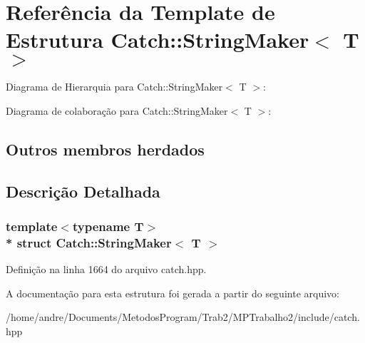 \hypertarget{structCatch_1_1StringMaker}{}\section{Referência da Template de Estrutura Catch\+:\+:String\+Maker$<$ T $>$}
\label{structCatch_1_1StringMaker}


Diagrama de Hierarquia para Catch\+:\+:String\+Maker$<$ T $>$\+:


Diagrama de colaboração para Catch\+:\+:String\+Maker$<$ T $>$\+:
\subsection*{Outros membros herdados}


\subsection{Descrição Detalhada}
\subsubsection*{template$<$typename T$>$\\*
struct Catch\+::\+String\+Maker$<$ T $>$}



Definição na linha 1664 do arquivo catch.\+hpp.



A documentação para esta estrutura foi gerada a partir do seguinte arquivo\+:\begin{DoxyCompactItemize}
\item 
/home/andre/\+Documents/\+Metodos\+Program/\+Trab2/\+M\+P\+Trabalho2/include/catch.\+hpp\end{DoxyCompactItemize}
